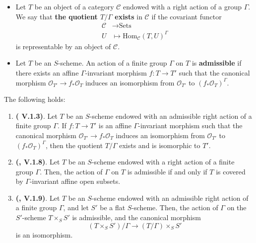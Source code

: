 \begin{definition}
    \noindent
    \begin{itemize}
        \item Let $T$ be an object of a category $\mathcal{C}$ endowed with a right action of a group $\Gamma$. We say that \textbf{the quotient $T/\Gamma$ exists} in $\mathcal{C}$ if the covariant functor
    \[
    \begin{aligned}
    \mathcal{C} &\to \text{Sets} \\
    U &\mapsto \text{Hom}_{\mathcal{C}}(T, U)^{\Gamma}
    \end{aligned}
    \]
    is representable by an object of $\mathcal{C}$.
    \item Let $T$ be an $S$-scheme. An action of a finite group $\Gamma$ on $T$ is \textbf{admissible} if there exists an affine $\Gamma$-invariant morphism $f : T \to T'$ such that the canonical morphism $\mathcal{O}_{T'} \to f_* \mathcal{O}_T$ induces an isomorphism from $\mathcal{O}_{T'}$ to $(f_* \mathcal{O}_T)^{\Gamma}$.
\end{itemize}
\end{definition}

\begin{prop}
    The following holds:
    \begin{enumerate}
        \item \textbf{(\cite{sga1} V.1.3)}. Let $T$ be an $S$-scheme endowed with an admissible right action of a finite group $\Gamma$. If $f : T \to T'$ is an affine $\Gamma$-invariant morphism such that the canonical morphism $\mathcal{O}_{T'} \to f_* \mathcal{O}_T$ induces an isomorphism from $\mathcal{O}_{T'}$ to $(f_* \mathcal{O}_T)^{\Gamma}$, then the quotient $T/\Gamma$ exists and is isomorphic to $T'$.
        \item \textbf{(\cite{sga1}, V.1.8)}. Let $T$ be an $S$-scheme endowed with a right action of a finite group $\Gamma$. Then, the action of $\Gamma$ on $T$ is admissible if and only if $T$ is covered by $\Gamma$-invariant affine open subsets.
        \item \textbf{(\cite{sga1}, V.1.9)}. Let $T$ be an $S$-scheme endowed with an admissible right action of a finite group $\Gamma$, and let $S'$ be a flat $S$-scheme. Then, the action of $\Gamma$ on the $S'$-scheme $T \times_S S'$ is admissible, and the canonical morphism
            \[
            (T \times_S S')/\Gamma \to (T/\Gamma) \times_S S'
            \]
            is an isomorphism.
    \end{enumerate}
\end{prop}



